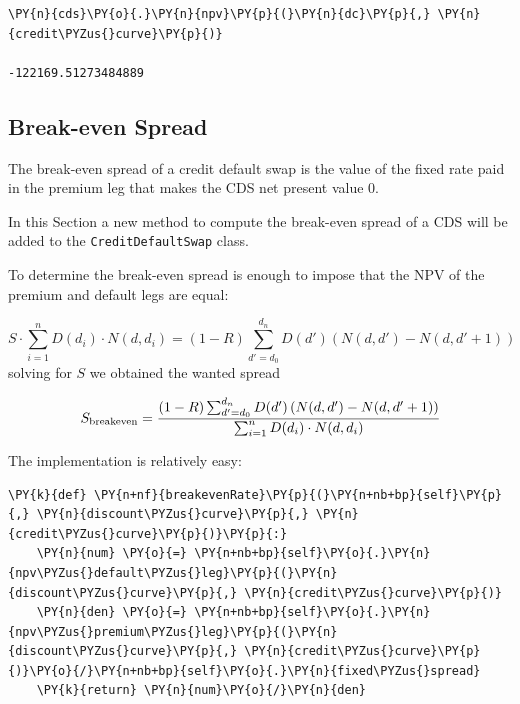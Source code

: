 \begin{tcolorbox}[breakable, size=fbox, boxrule=1pt, pad at break*=1mm,colback=cellbackground, colframe=cellborder]
\begin{Verbatim}[commandchars=\\\{\}]
\PY{n}{cds}\PY{o}{.}\PY{n}{npv}\PY{p}{(}\PY{n}{dc}\PY{p}{,} \PY{n}{credit\PYZus{}curve}\PY{p}{)}

-122169.51273484889
\end{Verbatim}
\end{tcolorbox}
	
\subsection{Break-even Spread}
The break-even spread of a credit default swap is the value of the fixed rate paid in the premium leg that makes the CDS net present value 0.

In this Section a new method to compute the break-even spread of a CDS will be added to the \texttt{CreditDefaultSwap} class.

To determine the break-even spread is enough to impose that the NPV of the premium and default legs are equal:

\begin{equation}
S \cdot\sum_{i=1}^{n} D(d_i) \cdot N(d, d_i)
= (1-R) \sum_{d'=d_0}^{d_n} D(d') \left( N(d, d') - N(d, d'+1) \right)
\end{equation}
solving for $S$ we obtained the wanted spread

\begin{equation}
S_{\mathrm{breakeven}} = \cfrac{(1-R) \sum_{d'=d_0}^{d_n} D(d') \left( N(d, d') - N(d, d'+1) \right)}{\sum_{i=1}^{n} D(d_i) \cdot N(d, d_i)}
\end{equation}

The implementation is relatively easy:

\begin{tcolorbox}[breakable, size=fbox, boxrule=1pt, pad at break*=1mm,colback=cellbackground, colframe=cellborder]
\begin{Verbatim}[commandchars=\\\{\}]
  \PY{k}{def} \PY{n+nf}{breakevenRate}\PY{p}{(}\PY{n+nb+bp}{self}\PY{p}{,} \PY{n}{discount\PYZus{}curve}\PY{p}{,} \PY{n}{credit\PYZus{}curve}\PY{p}{)}\PY{p}{:}
    \PY{n}{num} \PY{o}{=} \PY{n+nb+bp}{self}\PY{o}{.}\PY{n}{npv\PYZus{}default\PYZus{}leg}\PY{p}{(}\PY{n}{discount\PYZus{}curve}\PY{p}{,} \PY{n}{credit\PYZus{}curve}\PY{p}{)}
    \PY{n}{den} \PY{o}{=} \PY{n+nb+bp}{self}\PY{o}{.}\PY{n}{npv\PYZus{}premium\PYZus{}leg}\PY{p}{(}\PY{n}{discount\PYZus{}curve}\PY{p}{,} \PY{n}{credit\PYZus{}curve}\PY{p}{)}\PY{o}{/}\PY{n+nb+bp}{self}\PY{o}{.}\PY{n}{fixed\PYZus{}spread}
    \PY{k}{return} \PY{n}{num}\PY{o}{/}\PY{n}{den}
\end{Verbatim}
\end{tcolorbox}

